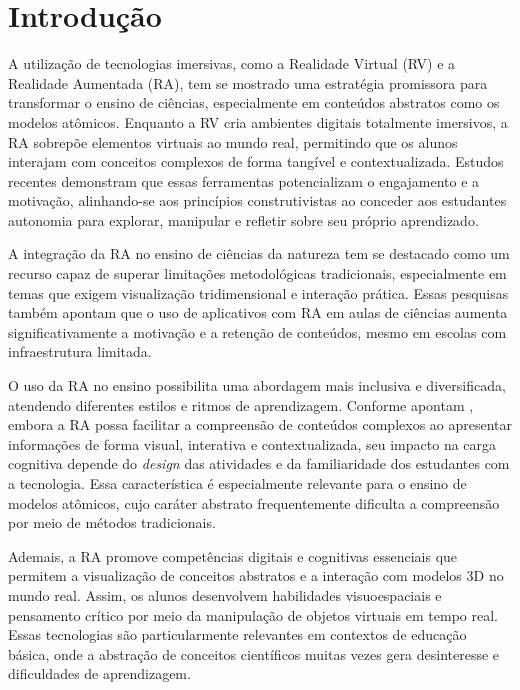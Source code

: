 \documentclass[portuguese]{textolivre}
\begin{document}
\section{Introdução}\label{sec-intro}
A utilização de tecnologias imersivas, como a Realidade Virtual (RV) e a Realidade Aumentada (RA), tem se mostrado uma estratégia promissora para transformar o ensino de ciências, especialmente em conteúdos abstratos como os modelos atômicos. Enquanto a RV cria ambientes digitais totalmente imersivos, a RA sobrepõe elementos virtuais ao mundo real, permitindo que os alunos interajam com conceitos complexos de forma tangível e contextualizada. Estudos recentes \cite{santos2023, tito2022} demonstram que essas ferramentas potencializam o engajamento e a motivação, alinhando-se aos princípios construtivistas ao conceder aos estudantes autonomia para explorar, manipular e refletir sobre seu próprio aprendizado.

A integração da RA no ensino de ciências da natureza tem se destacado como um recurso capaz de superar limitações metodológicas tradicionais, especialmente em temas que exigem visualização tridimensional e interação prática. Essas pesquisas também apontam que o uso de aplicativos com RA em aulas de ciências aumenta significativamente a motivação e a retenção de conteúdos, mesmo em escolas com infraestrutura limitada.

O uso da RA no ensino possibilita uma abordagem mais inclusiva e diversificada, atendendo diferentes estilos e ritmos de aprendizagem. Conforme apontam \textcite{caberoalmenara2023carga}, embora a RA possa facilitar a compreensão de conteúdos complexos ao apresentar informações de forma visual, interativa e contextualizada, seu impacto na carga cognitiva depende do \textit{design} das atividades e da familiaridade dos estudantes com a tecnologia. Essa característica é especialmente relevante para o ensino de modelos atômicos, cujo caráter abstrato frequentemente dificulta a compreensão por meio de métodos tradicionais.

Ademais, a RA promove competências digitais e cognitivas essenciais que permitem a visualização de conceitos abstratos e a interação com modelos 3D no mundo real. Assim, os alunos desenvolvem habilidades visuoespaciais e pensamento crítico por meio da manipulação de objetos virtuais em tempo real. Essas tecnologias são particularmente relevantes em contextos de educação básica, onde a abstração de conceitos científicos muitas vezes gera desinteresse e dificuldades de aprendizagem.
\end{document}
